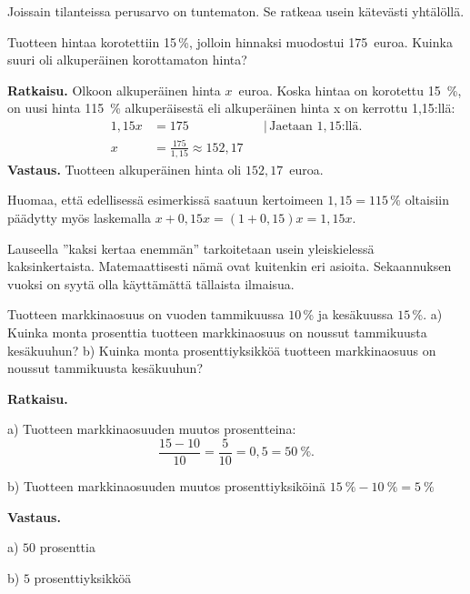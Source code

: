Joissain tilanteissa perusarvo on tuntematon. Se ratkeaa usein kätevästi yhtälöllä.
\begin{esimerkki}
Tuotteen hintaa korotettiin 15\,\%, jolloin hinnaksi muodostui 175~euroa. Kuinka suuri oli alkuperäinen korottamaton hinta?

\textbf{Ratkaisu.} 
Olkoon alkuperäinen hinta $x$~euroa. Koska hintaa on korotettu 15~\%, on uusi hinta 115~\% alkuperäisestä eli alkuperäinen hinta x on kerrottu 1,15:llä:
\begin{align*}
	1,15x	&= 175	&	&|\, \text{Jaetaan $1,15$:llä.} \\
	x	&= \frac{175}{1,15} \approx 152,17
\end{align*}
    \textbf{Vastaus.}
    Tuotteen alkuperäinen hinta oli $152,17$~euroa.
\end{esimerkki}

Huomaa, että edellisessä esimerkissä saatuun kertoimeen $1,15 = 115\,\%$ oltaisiin päädytty myös laskemalla $x + 0,15x = (1 + 0,15)x = 1,15x$.

Lauseella ''kaksi kertaa enemmän'' tarkoitetaan usein yleiskielessä kaksinkertaista.
Matemaattisesti nämä ovat kuitenkin eri asioita.
Sekaannuksen vuoksi on syytä olla käyttämättä tällaista ilmaisua.


\begin{esimerkki}
    Tuotteen markkinaosuus on vuoden tammikuussa $10$\,\% ja kesäkuussa $15$\,\%.
    \newline a) Kuinka monta prosenttia tuotteen markkinaosuus on noussut tammikuusta kesäkuuhun?
    \newline b) Kuinka monta prosenttiyksikköä tuotteen markkinaosuus on noussut tammikuusta kesäkuuhun?

    \textbf{Ratkaisu.}
    
a) Tuotteen markkinaosuuden muutos prosentteina:
          \[
                \frac{15-10}{10} = \frac{5}{10} = 0,5 = 50~\%.
          \]
  
b) Tuotteen markkinaosuuden muutos prosenttiyksiköinä $15~\%-10~\%=5~\%$

\textbf{Vastaus.}

a) $50$ prosenttia

b) $5$ prosenttiyksikköä
\end{esimerkki}
